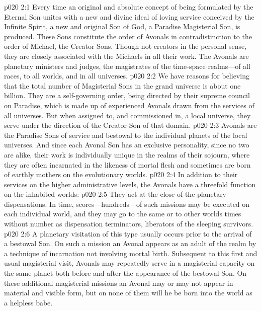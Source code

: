 \vs p020 2:1 Every time an original and absolute concept of being formulated by the Eternal Son unites with a new and divine ideal of loving service conceived by the Infinite Spirit, a new and original Son of God, a Paradise Magisterial Son, is produced. These Sons constitute the order of Avonals in contradistinction to the order of Michael, the Creator Sons. Though not creators in the personal sense, they are closely associated with the Michaels in all their work. The Avonals are planetary ministers and judges, the magistrates of the time\hyp{}space realms---of all races, to all worlds, and in all universes.\plusone
\vs p020 2:2 We have reasons for believing that the total number of Magisterial Sons in the grand universe is about one billion. They are a self\hyp{}governing order, being directed by their supreme council on Paradise, which is made up of experienced Avonals drawn from the services of all universes. But when assigned to, and commissioned in, a local universe, they serve under the direction of the Creator Son of that domain.
\vs p020 2:3 Avonals are the Paradise Sons of service and bestowal to the individual planets of the local universes. And since each Avonal Son has an exclusive personality, since no two are alike, their work is individually unique in the realms of their sojourn, where they are often incarnated in the likeness of mortal flesh and sometimes are born of earthly mothers on the evolutionary worlds.
\pc \vs p020 2:4 In addition to their services on the higher administrative levels, the Avonals have a threefold function on the inhabited worlds:
\pc \vs p020 2:5 \bibnobreakspace {} They act at the close of the planetary dispensations. In time, scores---hundreds---of such missions may be executed on each individual world, and they may go to the same or to other worlds times without number as dispensation terminators, liberators of the sleeping survivors.
\pc \vs p020 2:6 \bibnobreakspace {} A planetary visitation of this type usually occurs prior to the arrival of a bestowal Son. On such a mission an Avonal appears as an adult of the realm by a technique of incarnation not involving mortal birth. Subsequent to this first and usual magisterial visit, Avonals may repeatedly serve in a magisterial capacity on the same planet both before and after the appearance of the bestowal Son. On these additional magisterial missions an Avonal may or may not appear in material and visible form, but on none of them will he be born into the world as a helpless babe.
